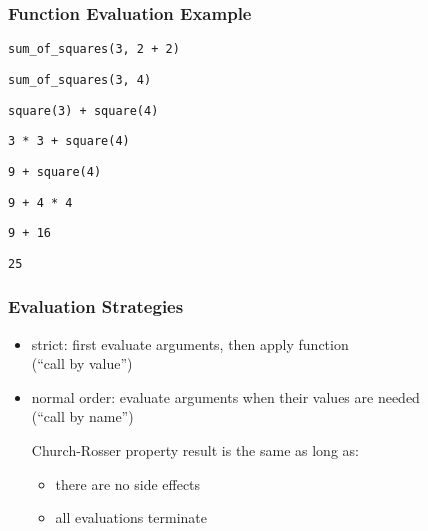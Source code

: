 \documentclass[dvipsnames]{beamer}
\theoremstyle{plain}
\begin{document}
\begin{frame}
  \frametitle{Function Evaluation Example}

  \begin{exampleblock}{}
    \lstinline|sum_of_squares(3, 2 + 2)|

    \pause
    \medskip
    \lstinline|sum_of_squares(3, 4)|

    \pause
    \medskip
    \lstinline|square(3) + square(4)|

    \pause
    \medskip
    \lstinline|3 * 3 + square(4)|

    \pause
    \medskip
    \lstinline|9 + square(4)|

    \pause
    \medskip
    \lstinline|9 + 4 * 4|

    \pause
    \medskip
    \lstinline|9 + 16|

    \pause
    \medskip
    \lstinline|25|
  \end{exampleblock}
\end{frame}

\begin{frame}
  \frametitle{Evaluation Strategies}

  \begin{itemize}
    \item \alert{strict}: first evaluate arguments, then apply function\\
      (``call by value'')

    \pause
    \medskip
    \item \alert{normal order}: evaluate arguments when their values are needed\\
      (``call by name'')

    \pause
    \medskip
    \begin{block}{Church-Rosser property}
      result is the same as long as:
      \begin{itemize}
        \item there are no side effects
        \item all evaluations terminate
      \end{itemize}
    \end{block}
  \end{itemize}
\end{frame}
\end{document}
